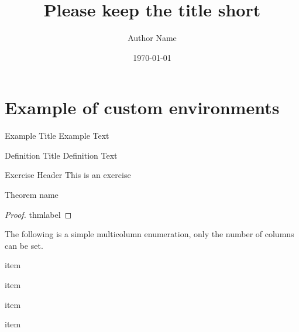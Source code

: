 \documentclass{mathcourse}
\title{Please keep the title short}
\author{Author Name}
\date{\today}
\begin{document}
\maketitle
\thispagestyle{empty}

\clearpage
\hypertarget{contents}{}
\thispagestyle{fancy}
\tableofcontents

\clearpage
\section{Example of custom environments}
\lipsum[1]
\begin{example}{Example Title}
    Example Text
    \lipsum[66]
\end{example}


\begin{definition}{Definition Title}
    Definition Text
    \lipsum[66]
\end{definition}

\begin{exercise}{Exercise Header}
    This is an exercise
    \lipsum[66]
\end{exercise}

\begin{theorem}[thmlabel]{Theorem name}
    \lipsum[66]
\end{theorem}

\begin{proof}{thmlabel}
    \lipsum[66]
\end{proof}

The following is a simple multicolumn enumeration, only the number of columns can be set.
\begin{enumulti}{2}
    \item{item}
    \item{item}
    \item{item}
    \item{item}
\end{enumulti}


\listofexercises
\end{document}

